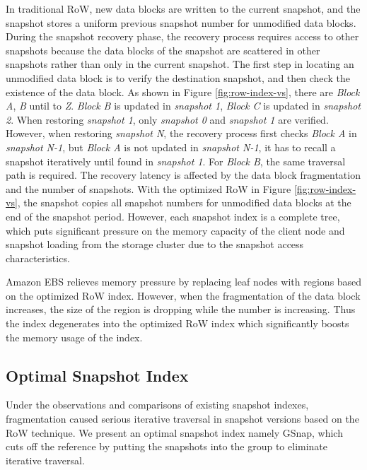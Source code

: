 \documentclass[sigconf, nonacm]{acmart}
\begin{document}
In traditional RoW, new data blocks are written to the current snapshot, and the snapshot stores a uniform previous snapshot number for unmodified data blocks. During the snapshot recovery phase, the recovery process requires access to other snapshots because the data blocks of the snapshot are scattered in other snapshots rather than only in the current snapshot. The first step in locating an unmodified data block is to verify the destination snapshot, and then check the existence of the data block. As shown in Figure \ref{fig:row-index-vs}, there are \emph{Block A}, \emph{B} until to \emph{Z}. \emph{Block B} is updated in \emph{snapshot 1}, \emph{Block C} is updated in \emph{snapshot 2}. When restoring \emph{snapshot 1}, only \emph{snapshot 0} and \emph{snapshot 1} are verified. However, when restoring \emph{snapshot N}, the recovery process first checks \emph{Block A} in \emph{snapshot N-1}, but \emph{Block A} is not updated in \emph{snapshot N-1},  it has to recall a snapshot iteratively until found in \emph{snapshot 1}. For \emph{Block B}, the same traversal path is required. The recovery latency is affected by the data block fragmentation and the number of snapshots.
With the optimized RoW in Figure \ref{fig:row-index-vs}, the snapshot copies all snapshot numbers for unmodified data blocks at the end of the snapshot period.
However, each snapshot index is a complete tree, which puts significant pressure on the memory capacity of the client node and snapshot loading from the storage cluster due to the snapshot access characteristics.

Amazon EBS \cite{varia2014overview} relieves memory pressure by replacing leaf nodes with regions based on the optimized RoW index.
However, when the fragmentation of the data block increases, the size of the region is dropping while the number is increasing. Thus the index degenerates into the optimized RoW index which significantly boosts the memory usage of the index.

\subsection{Optimal Snapshot Index}
Under the observations and comparisons of existing snapshot indexes, fragmentation caused serious iterative traversal in snapshot versions based on the RoW technique.  
We present an optimal snapshot index namely GSnap, which cuts off the reference by putting the snapshots into the group to eliminate iterative traversal. 
\end{document}
